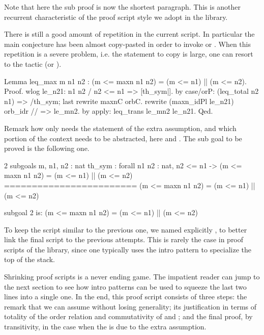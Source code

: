 Note that here the sub proof is now the shortest paragraph.
This is another recurrent characteristic of the proof script style
we adopt in the \mcbMC{} library.

There is still a good amount of repetition in the current script.
In particular the main conjecture has been almost copy-pasted in
order to invoke  or .  When this repetition
is a severe problem, i.e. the statement to copy is large, one
can resort to the  tactic (or ).

\begin{coq}{}{}
Lemma leq_max m n1 n2 : (m <= maxn n1 n2) = (m <= n1) || (m <= n2).
Proof.
wlog le_n21: n1 n2 / n2 <= n1  => [th_sym|].
  by case/orP: (leq_total n2 n1) => /th_sym; last rewrite maxnC orbC.
rewrite (maxn_idPl le_n21) orb_idr // => le_mn2.
by apply: leq_trans le_mn2 le_n21.
Qed.
\end{coq}

Remark how  only needs the statement of the extra assumption,
and which portion of the context needs to be abstracted, here  and
.  The sub goal to be proved is the following one.

\begin{coqout}{}{}
2 subgoals
m, n1, n2 : nat
th_sym : forall n1 n2 : nat, n2 <= n1 ->
           (m <= maxn n1 n2) = (m <= n1) || (m <= n2)
========================
(m <= maxn n1 n2) = (m <= n1) || (m <= n2)


subgoal 2 is:
(m <= maxn n1 n2) = (m <= n1) || (m <= n2)
\end{coqout}

To keep the script similar to the previous one, we named explicitly
, to better link the final script to the previous attempts.
This is rarely the case in proof scripts of the library, since one typically
uses the  intro pattern to specialize the top of the stack.

Shrinking proof scripts is a never ending game.  The impatient reader can
jump to the next section to see
how intro patterns can be used to squeeze the last two lines into a
single one.  In the end, this proof script consists of three steps:
the remark that we can
assume  without losing generality; its justification in
terms of totality of the order relation and commutativity of 
and \C{||}; and the final proof, by transitivity, in the case when
the  is  due to the extra assumption.


